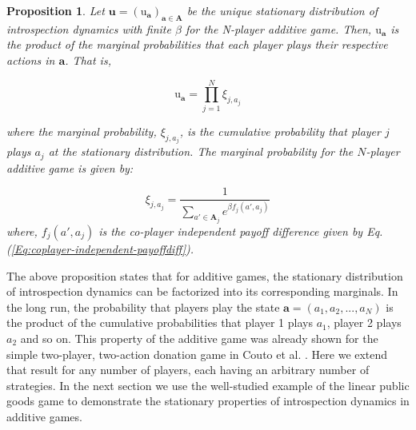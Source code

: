 \documentclass[11pt]{article}
\theoremstyle{plainCl1}
\newtheorem{Prop}{Proposition}
\theoremstyle{plainCl2}
\newcommand{\A}{\mathbf{A}}
\newcommand{\abf}{\mathbf{a}}
\newcommand{\ubf}{\mathbf{u}}
\begin{document}
\begin{Prop}
Let $\ubf = (\mathrm{u}_\abf)_{\abf \in \A}$ be the unique stationary distribution of introspection dynamics with finite $\beta$ for the N-player additive game. Then, $\mathrm{u}_\abf$ is the product of the marginal probabilities that each player plays their respective actions in $\abf$. That is, 

\begin{equation}
\mathrm{u}_\abf = \prod_{j = 1}^N \xi_{j,a_j}
\label{Eq:additive-game-products}
\end{equation}

\noindent where the marginal probability, $\xi_{j,a_j}$, is the cumulative probability that player $j$ plays $a_j$ at the stationary distribution. The marginal probability for the $N$-player additive game is given by: 

\begin{equation}
\xi_{j,a_j} = \frac{1}{\displaystyle \sum_{a' \in \A_j} e^{\beta f_j(a',a_j)}} 
\label{Eq:marginal-at-additive-game}
\end{equation}
\noindent where, $f_j(a', a_j)$ is the co-player independent payoff difference given by Eq. (\ref{Eq:coplayer-independent-payoffdiff}).
\label{Th:additive-game-product-of-marginals}
\end{Prop}
\noindent The above proposition states that for additive games, the stationary distribution of introspection dynamics can be factorized into its corresponding marginals. In the long run, the probability that players play the state $\abf = (a_1, a_2, ...,a_N)$ is the product of the cumulative probabilities that player 1 plays $a_1$, player 2 plays $a_2$ and so on. This property of the additive game was already shown for the simple two-player, two-action donation game in Couto et al. \cite{Couto:NJP:2022}.  Here we extend that result for any number of players, each having an arbitrary number of strategies. In the next section we use the well-studied example of the linear public goods game to demonstrate the stationary properties of introspection dynamics in additive games. 
\end{document}
